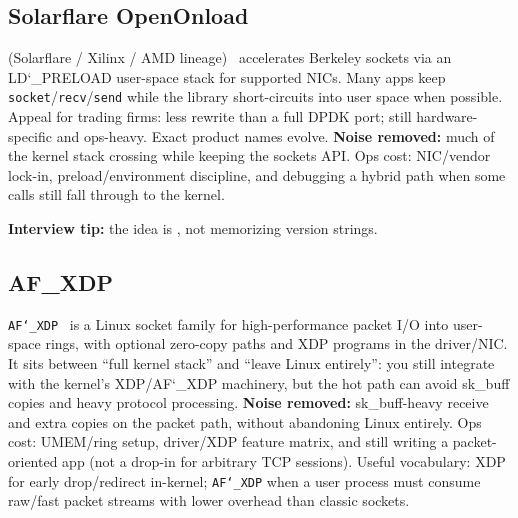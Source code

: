 \subsection{Solarflare OpenOnload}
\label{subsec:openonload}
 (Solarflare / Xilinx / AMD lineage)~\cite{openonload-docs} accelerates 
 Berkeley sockets via an LD\char`_PRELOAD user-space stack for supported 
NICs. Many apps keep \texttt{socket}/\texttt{recv}/\texttt{send} while the library short-circuits 
into user space when possible.
\newline
Appeal for trading firms: less rewrite than a full DPDK port; still hardware-specific and 
ops-heavy. Exact product names evolve.
\newline
\textbf{Noise removed:} much of the kernel stack crossing while keeping the sockets API. 
Ops cost: NIC/vendor lock-in, preload/environment discipline, and debugging a hybrid path 
when some calls still fall through to the kernel.
\par\noindent\textbf{Interview tip:} the idea is , 
not memorizing version strings.

\subsection{AF\_XDP}
\label{subsec:af-xdp}
\texttt{AF\char`_XDP}~\cite{af-xdp-docs} is a Linux socket family for high-performance packet 
I/O into user-space  rings, with optional zero-copy paths and XDP programs in 
the driver/NIC. It sits between ``full kernel stack'' and ``leave Linux entirely'': you still 
integrate with the kernel's XDP/AF\char`_XDP machinery, but the hot path can avoid sk\_buff 
copies and heavy protocol processing.
\newline
\textbf{Noise removed:} sk\_buff-heavy receive and extra copies on the packet path, without 
abandoning Linux entirely. Ops cost: UMEM/ring setup, driver/XDP feature matrix, and still 
writing a packet-oriented app (not a drop-in for arbitrary TCP sessions).
\newline
Useful vocabulary: XDP for early drop/redirect in-kernel; \texttt{AF\char`_XDP} when a 
user process must consume raw/fast packet streams with lower overhead than classic sockets.

